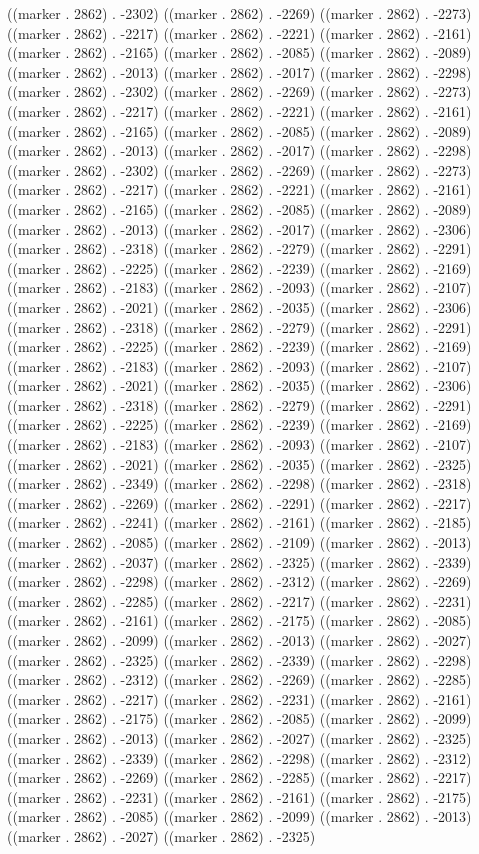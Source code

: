 ((marker . 2862) . -2302) ((marker . 2862) . -2269) ((marker . 2862) . -2273) ((marker . 2862) . -2217) ((marker . 2862) . -2221) ((marker . 2862) . -2161) ((marker . 2862) . -2165) ((marker . 2862) . -2085) ((marker . 2862) . -2089) ((marker . 2862) . -2013) ((marker . 2862) . -2017) ((marker . 2862) . -2298) ((marker . 2862) . -2302) ((marker . 2862) . -2269) ((marker . 2862) . -2273) ((marker . 2862) . -2217) ((marker . 2862) . -2221) ((marker . 2862) . -2161) ((marker . 2862) . -2165) ((marker . 2862) . -2085) ((marker . 2862) . -2089) ((marker . 2862) . -2013) ((marker . 2862) . -2017) ((marker . 2862) . -2298) ((marker . 2862) . -2302) ((marker . 2862) . -2269) ((marker . 2862) . -2273) ((marker . 2862) . -2217) ((marker . 2862) . -2221) ((marker . 2862) . -2161) ((marker . 2862) . -2165) ((marker . 2862) . -2085) ((marker . 2862) . -2089) ((marker . 2862) . -2013) ((marker . 2862) . -2017) ((marker . 2862) . -2306) ((marker . 2862) . -2318) ((marker . 2862) . -2279) ((marker . 2862) . -2291) ((marker . 2862) . -2225) ((marker . 2862) . -2239) ((marker . 2862) . -2169) ((marker . 2862) . -2183) ((marker . 2862) . -2093) ((marker . 2862) . -2107) ((marker . 2862) . -2021) ((marker . 2862) . -2035) ((marker . 2862) . -2306) ((marker . 2862) . -2318) ((marker . 2862) . -2279) ((marker . 2862) . -2291) ((marker . 2862) . -2225) ((marker . 2862) . -2239) ((marker . 2862) . -2169) ((marker . 2862) . -2183) ((marker . 2862) . -2093) ((marker . 2862) . -2107) ((marker . 2862) . -2021) ((marker . 2862) . -2035) ((marker . 2862) . -2306) ((marker . 2862) . -2318) ((marker . 2862) . -2279) ((marker . 2862) . -2291) ((marker . 2862) . -2225) ((marker . 2862) . -2239) ((marker . 2862) . -2169) ((marker . 2862) . -2183) ((marker . 2862) . -2093) ((marker . 2862) . -2107) ((marker . 2862) . -2021) ((marker . 2862) . -2035) ((marker . 2862) . -2325) ((marker . 2862) . -2349) ((marker . 2862) . -2298) ((marker . 2862) . -2318) ((marker . 2862) . -2269) ((marker . 2862) . -2291) ((marker . 2862) . -2217) ((marker . 2862) . -2241) ((marker . 2862) . -2161) ((marker . 2862) . -2185) ((marker . 2862) . -2085) ((marker . 2862) . -2109) ((marker . 2862) . -2013) ((marker . 2862) . -2037) ((marker . 2862) . -2325) ((marker . 2862) . -2339) ((marker . 2862) . -2298) ((marker . 2862) . -2312) ((marker . 2862) . -2269) ((marker . 2862) . -2285) ((marker . 2862) . -2217) ((marker . 2862) . -2231) ((marker . 2862) . -2161) ((marker . 2862) . -2175) ((marker . 2862) . -2085) ((marker . 2862) . -2099) ((marker . 2862) . -2013) ((marker . 2862) . -2027) ((marker . 2862) . -2325) ((marker . 2862) . -2339) ((marker . 2862) . -2298) ((marker . 2862) . -2312) ((marker . 2862) . -2269) ((marker . 2862) . -2285) ((marker . 2862) . -2217) ((marker . 2862) . -2231) ((marker . 2862) . -2161) ((marker . 2862) . -2175) ((marker . 2862) . -2085) ((marker . 2862) . -2099) ((marker . 2862) . -2013) ((marker . 2862) . -2027) ((marker . 2862) . -2325) ((marker . 2862) . -2339) ((marker . 2862) . -2298) ((marker . 2862) . -2312) ((marker . 2862) . -2269) ((marker . 2862) . -2285) ((marker . 2862) . -2217) ((marker . 2862) . -2231) ((marker . 2862) . -2161) ((marker . 2862) . -2175) ((marker . 2862) . -2085) ((marker . 2862) . -2099) ((marker . 2862) . -2013) ((marker . 2862) . -2027) ((marker . 2862) . -2325) 